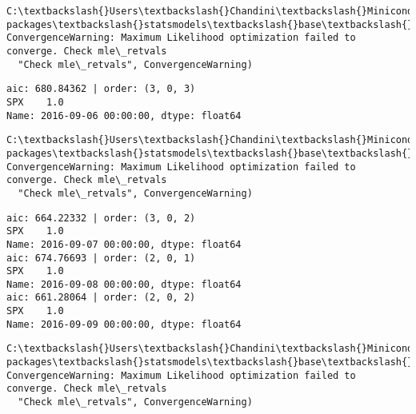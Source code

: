 \documentclass[11pt]{article}
\begin{document}
    \begin{Verbatim}[commandchars=\\\{\}]
C:\textbackslash{}Users\textbackslash{}Chandini\textbackslash{}Miniconda3\textbackslash{}envs\textbackslash{}auquan\textbackslash{}lib\textbackslash{}site-packages\textbackslash{}statsmodels\textbackslash{}base\textbackslash{}model.py:496: ConvergenceWarning: Maximum Likelihood optimization failed to converge. Check mle\_retvals
  "Check mle\_retvals", ConvergenceWarning)

    \end{Verbatim}

    \begin{Verbatim}[commandchars=\\\{\}]
aic: 680.84362 | order: (3, 0, 3)
SPX    1.0
Name: 2016-09-06 00:00:00, dtype: float64

    \end{Verbatim}

    \begin{Verbatim}[commandchars=\\\{\}]
C:\textbackslash{}Users\textbackslash{}Chandini\textbackslash{}Miniconda3\textbackslash{}envs\textbackslash{}auquan\textbackslash{}lib\textbackslash{}site-packages\textbackslash{}statsmodels\textbackslash{}base\textbackslash{}model.py:496: ConvergenceWarning: Maximum Likelihood optimization failed to converge. Check mle\_retvals
  "Check mle\_retvals", ConvergenceWarning)

    \end{Verbatim}

    \begin{Verbatim}[commandchars=\\\{\}]
aic: 664.22332 | order: (3, 0, 2)
SPX    1.0
Name: 2016-09-07 00:00:00, dtype: float64
aic: 674.76693 | order: (2, 0, 1)
SPX    1.0
Name: 2016-09-08 00:00:00, dtype: float64
aic: 661.28064 | order: (2, 0, 2)
SPX    1.0
Name: 2016-09-09 00:00:00, dtype: float64

    \end{Verbatim}

    \begin{Verbatim}[commandchars=\\\{\}]
C:\textbackslash{}Users\textbackslash{}Chandini\textbackslash{}Miniconda3\textbackslash{}envs\textbackslash{}auquan\textbackslash{}lib\textbackslash{}site-packages\textbackslash{}statsmodels\textbackslash{}base\textbackslash{}model.py:496: ConvergenceWarning: Maximum Likelihood optimization failed to converge. Check mle\_retvals
  "Check mle\_retvals", ConvergenceWarning)

    \end{Verbatim}
\end{document}
